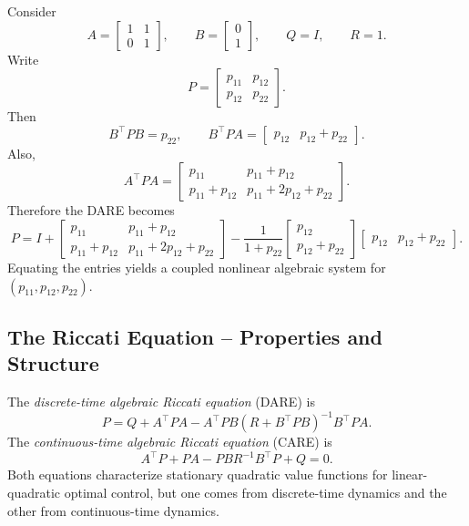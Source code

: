 \begin{eg}
	Consider
	\[
		A=\begin{bmatrix}1 & 1 \\ 0 & 1\end{bmatrix},
		\qquad
		B=\begin{bmatrix}0 \\ 1\end{bmatrix},
		\qquad
		Q=I,
		\qquad
		R=1.
	\]
	Write
	\[
		P=\begin{bmatrix}p_{11} & p_{12} \\ p_{12} & p_{22}\end{bmatrix}.
	\]
	Then
	\[
		B^\top P B = p_{22},
		\qquad
		B^\top P A = \begin{bmatrix}p_{12} & p_{12}+p_{22}\end{bmatrix}.
	\]
	Also,
	\[
		A^\top P A =
		\begin{bmatrix}
			p_{11} & p_{11}+p_{12} \\
			p_{11}+p_{12} & p_{11}+2p_{12}+p_{22}
		\end{bmatrix}.
	\]
	Therefore the DARE becomes
	\[
		P
		=
		I
		+
		\begin{bmatrix}
			p_{11} & p_{11}+p_{12} \\
			p_{11}+p_{12} & p_{11}+2p_{12}+p_{22}
		\end{bmatrix}
		-
		\frac{1}{1+p_{22}}
		\begin{bmatrix}
			p_{12} \\
			p_{12}+p_{22}
		\end{bmatrix}
		\begin{bmatrix}
			p_{12} & p_{12}+p_{22}
		\end{bmatrix}.
	\]
	Equating the entries yields a coupled nonlinear algebraic system for $(p_{11},p_{12},p_{22})$.
\end{eg}

\subsection{The Riccati Equation -- Properties and Structure}
\label{sec:l6-the-riccati-equation-properties-and-structure}

\begin{definition}\label{def:l6-dare-versus-care}
	The \emph{discrete-time algebraic Riccati equation} (DARE) is
	\[
		P = Q + A^\top P A - A^\top P B\left(R+B^\top P B\right)^{-1}B^\top P A.
	\]
	The \emph{continuous-time algebraic Riccati equation} (CARE) is
	\[
		A^\top P + P A - P B R^{-1}B^\top P + Q = 0.
	\]
	Both equations characterize stationary quadratic value functions for linear-quadratic optimal control, but one comes from discrete-time dynamics and the other from continuous-time dynamics.
\end{definition}

